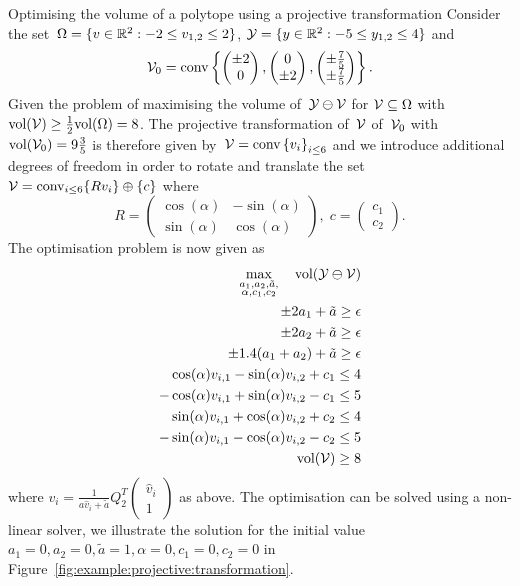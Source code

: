 %
\begin{example}{Optimising the volume of a polytope using a projective transformation}\label{example:projective:transformation:optimisation}
%
Consider the set~$\Omega = \{v\in\mathbb R^2:-2\leq v_{1,2}\leq 2\}$, $\mathcal Y = \{y\in\mathbb R^2:-5\leq y_{1,2}\leq 4\}$ and 
%
$$
\mathcal V_0 = \text{conv}\left\{\begin{pmatrix}\pm2\\0\end{pmatrix},\begin{pmatrix}0\\\pm2\end{pmatrix},\begin{pmatrix}\pm\frac{7}{5}\\\pm\frac{7}{5}\end{pmatrix}\right\}.
$$
%
Given the problem of maximising the volume of~$\mathcal Y\ominus\mathcal V$ for $\mathcal V\subseteq\Omega$ with $\text{vol}(\mathcal V)\geq\frac{1}{2} \text{vol}(\Omega)=8$.
%
The projective transformation of~$\mathcal V$ of~$\mathcal V_0$ with~$\text{vol}(\mathcal V_0)=9\frac{3}{5}$ is therefore given by~$\mathcal V=\text{conv}\left\{v_i\right\}_{i\leq 6}$ and we introduce additional degrees of freedom in order to rotate and translate the set~$\mathcal V=\text{conv}_{i\leq6}\{Rv_i\}\oplus\{c\}$ where
%
\[
R=\begin{pmatrix}\cos(\alpha)&-\sin(\alpha)\\\sin(\alpha)&\cos(\alpha)\end{pmatrix},\;c=\begin{pmatrix}c_1\\ c_2\end{pmatrix}.
\]
%
The optimisation problem is now given as
%
\[\begin{aligned}\max_{\substack{a_1,a_2,\tilde a,\\\alpha,c_1,c_2}}\quad\text{vol}(\Y\ominus\V)\\
\pm2 a_1+\tilde a\geq\epsilon\\
\pm2 a_2+\tilde a\geq\epsilon\\
\pm1.4(a_1+a_2)+\tilde a\geq \epsilon\\
\cos(\alpha)v_{i,1}-\sin(\alpha)v_{i,2}+c_1\leq 4\\
-\cos(\alpha)v_{i,1}+\sin(\alpha)v_{i,2}-c_1\leq 5\\
\sin(\alpha)v_{i,1}+\cos(\alpha)v_{i,2}+c_2\leq 4\\
-\sin(\alpha)v_{i,1}-\cos(\alpha)v_{i,2}-c_2\leq 5\\
\text{vol}(\V)\geq 8
\end{aligned}
%
\]
%
where $v_i=\frac{1}{a\hat v_i + \tilde a}Q_2^T\begin{pmatrix}\hat v_i \\ 1\end{pmatrix}$ as above.
%
The optimisation can be solved using a non-linear solver, we illustrate the solution for the initial value~$a_1=0,a_2=0,\tilde a=1,\alpha=0,c_1=0,c_2=0$ in Figure~\ref{fig:example:projective:transformation}.
%
\end{example}
